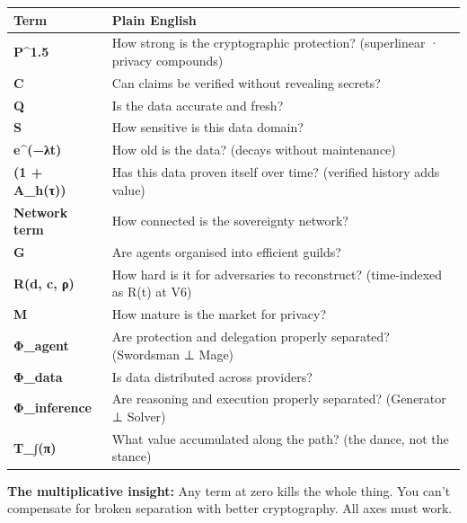 \documentclass[
  11pt,
]{article}
\newcounter{none} %
\begin{document}
{\def\LTcaptype{none} %
\begin{longtable}[]{@{}
  >{\raggedright\arraybackslash}p{}
  >{\raggedright\arraybackslash}p{}@{}}
\toprule\noalign{}
\begin{minipage}[b]{\linewidth}\raggedright
Term
\end{minipage} & \begin{minipage}[b]{\linewidth}\raggedright
Plain English
\end{minipage} \\
\midrule\noalign{}
\endhead
\bottomrule\noalign{}
\endlastfoot
\textbf{P\^{}1.5} & How strong is the cryptographic protection?
(superlinear · privacy compounds) \\
\textbf{C} & Can claims be verified without revealing secrets? \\
\textbf{Q} & Is the data accurate and fresh? \\
\textbf{S} & How sensitive is this data domain? \\
\textbf{e\^{}(−λt)} & How old is the data? (decays without
maintenance) \\
\textbf{(1 + A\_h(τ))} & Has this data proven itself over time?
(verified history adds value) \\
\textbf{Network term} & How connected is the sovereignty network? \\
\textbf{G} & Are agents organised into efficient guilds? \\
\textbf{R(d, c, ρ)} & How hard is it for adversaries to reconstruct?
(time-indexed as R(t) at V6) \\
\textbf{M} & How mature is the market for privacy? \\
\textbf{Φ\_agent} & Are protection and delegation properly separated?
(Swordsman ⊥ Mage) \\
\textbf{Φ\_data} & Is data distributed across providers? \\
\textbf{Φ\_inference} & Are reasoning and execution properly separated?
(Generator ⊥ Solver) \\
\textbf{T\_∫(π)} & What value accumulated along the path? (the dance,
not the stance) \\
\end{longtable}
}

\textbf{The multiplicative insight:} Any term at zero kills the whole
thing. You can't compensate for broken separation with better
cryptography. All axes must work.
\end{document}
